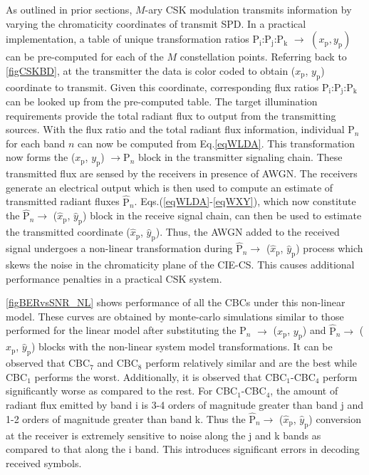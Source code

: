 \documentclass[10pt,letterpaper]{article}
\begin{document}
As outlined in prior sections, $M$-ary CSK modulation transmits information by varying the chromaticity coordinates of transmit SPD. In a practical implementation, a table of unique transformation ratios P$_{\text{i}}$:P$_{\text{j}}$:P$_{\text{k}}$ $\rightarrow$ $(x_{\text{p}},y_{\text{p}})$ can be pre-computed for each of the $M$ constellation points. Referring back to \figurename{ }\ref{figCSKBD}, at the transmitter the data is color coded to obtain ($x_{\text{p}}$, $y_{\text{p}}$) coordinate to transmit. Given this coordinate, corresponding flux ratios P$_{\text{i}}$:P$_{\text{j}}$:P$_{\text{k}}$ can be looked up from the pre-computed table. The target illumination requirements provide the total radiant flux to output from the transmitting sources. With the flux ratio and the total radiant flux information, individual P$_{n}$ for each band $n$ can now be computed from Eq.\eqref{eqWLDA}. This transformation now forms the ($x_{\text{p}}$, $y_{\text{p}}$) $\rightarrow  \text{P}_{n}$ block in the transmitter signaling chain. These transmitted flux are sensed by the receivers in presence of AWGN. The receivers generate an electrical output which is then used to compute an estimate of transmitted radiant fluxes $\hat{\text{P}}_{n}$. Eqs.(\ref{eqWLDA}-\ref{eqWXY}), which now constitute the $\hat{\text{P}}_{n}\rightarrow$ ($\hat{x}_{\text{p}}$, $\hat{y}_{\text{p}}$) block in the receive signal chain, can then be used to estimate the transmitted coordinate ($\hat{x}_{\text{p}}$, $\hat{y}_{\text{p}}$). Thus, the AWGN added to the received signal undergoes a non-linear transformation during $\hat{\text{P}}_{n}\rightarrow$ ($\hat{x}_{\text{p}}$, $\hat{y}_{\text{p}}$) process which skews the noise in the chromaticity plane of the CIE-CS. This causes additional performance penalties in a practical CSK system.


\figurename{ }\ref{figBERvsSNR_NL} shows performance of all the CBCs under this non-linear model. These curves are obtained by monte-carlo simulations similar to those performed for the linear model after substituting the P$_{n}$ $\rightarrow$ ($x_{\text{p}}$, $y_{\text{p}}$) and $\hat{\text{P}}_{n}\rightarrow$ ($\hat{x}_{\text{p}}$, $\hat{y}_{\text{p}}$) blocks with the non-linear system model transformations. It can be observed that CBC$_{7}$ and CBC$_{8}$ perform relatively similar and are the best while CBC$_{1}$ performs the worst. Additionally, it is observed that CBC$_{1}$-CBC$_{4}$ perform significantly worse as compared to the rest. For CBC$_{1}$-CBC$_{4}$, the amount of radiant flux emitted by band i is 3-4 orders of magnitude greater than band j and 1-2 orders of magnitude greater than band k. Thus the $\hat{\text{P}}_{n}\rightarrow$ ($\hat{x}_{\text{p}}$, $\hat{y}_{\text{p}}$) conversion at the receiver is extremely sensitive to noise along the j and k bands as compared to that along the i band. This introduces significant errors in decoding received symbols.
\end{document}
